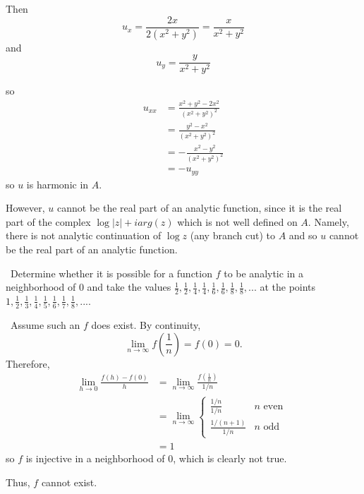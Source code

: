 \documentclass[12pt]{Qual}
\begin{document}
\begin{solution}
\begin{enumerate}[label=(\alph*)]
    Then $$u_x=\frac{2x}{2(x^2+y^2)}=\frac{x}{x^2+y^2}$$ and $$u_y=\frac{y}{x^2+y^2}$$

    so \begin{align*}
        u_{xx}&=\frac{x^2+y^2-2x^2}{(x^2+y^2)^2}\\
        &=\frac{y^2-x^2}{(x^2+y^2)^2}\\
        &=-\frac{x^2-y^2}{(x^2+y^2)^2}\\
        &=-u_{yy}
    \end{align*} so $u$ is harmonic in $A$.

    However, $u$ cannot be the real part of an analytic function, since it is the real part of the complex $\log|z|+iarg(z)$ which is not well defined on $A$. Namely, there is not analytic continuation of $\log z$ (any branch cut) to $A$ and so $u$ cannot be the real part of an analytic function.
\end{enumerate}
\end{solution}
\newpage





\begin{problem} $\,$
Determine whether it is possible for a function $f$ to be analytic in a neighborhood of $0$ and take the values $\frac{1}{2},\frac{1}{2},\frac{1}{4},\frac{1}{4},\frac{1}{6},\frac{1}{6},\frac{1}{8},\frac{1}{8},...$ at the points $1,\frac{1}{2},\frac{1}{3},\frac{1}{4},\frac{1}{5},\frac{1}{6},\frac{1}{7},\frac{1}{8},...$.
\end{problem}


\begin{solution}$\,$
Assume such an $f$ does exist. By continuity, $$\lim_{n\to\infty}f\left(\frac{1}{n}\right)=f(0)=0.$$ Therefore, \begin{align*}
    \lim_{h\to0}\frac{f(h)-f(0)}{h}&=\lim_{n\to\infty}\frac{f\left(\frac{1}{n}\right)}{1/n}\\
    &=\lim_{n\to\infty}\begin{cases}
\frac{1/n}{1/n} & n\text{ even }\\
\frac{1/(n+1)}{1/n} & n\text{ odd }
\end{cases}\\
&=1
\end{align*} so  $f$ is injective in a neighborhood of $0$, which is clearly not true.

Thus, $f$ cannot exist.
\end{solution}
\end{document}
